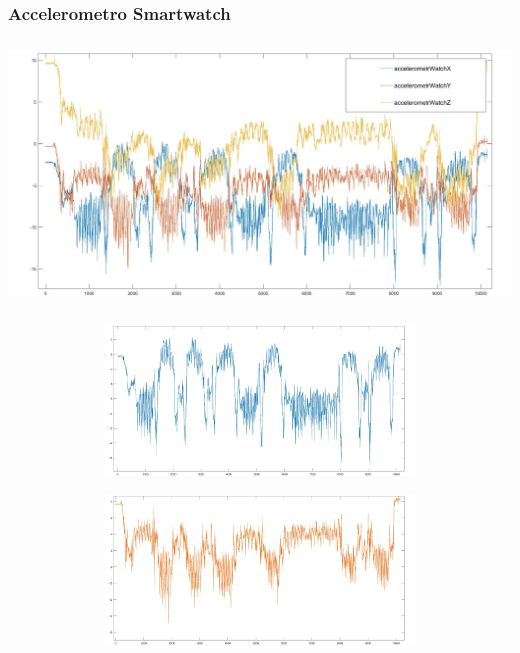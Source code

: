 \documentclass[a4paper]{article}
\begin{document}
\clearpage

\subsubsection{Accelerometro Smartwatch}
\begin{minipage}{\linewidth}
\begin{center}
\includegraphics[width=160mm, height= 70mm]{./images/registrazione_tesi/accelerometrXYZ.jpg} 
\end{center}
\end{minipage}
\makebox[\linewidth]{}
\makebox[\linewidth]{}\makebox[\linewidth]{}\makebox[\linewidth]{}
\makebox[\linewidth]{}\makebox[\linewidth]{}\makebox[\linewidth]{}
\makebox[\linewidth]{}\makebox[\linewidth]{}\makebox[\linewidth]{}

\begin{minipage}{\linewidth}
\begin{center}
\includegraphics[width=154mm, height= 40mm]{./images/registrazione_tesi/accX.jpg} 
\end{center}
\end{minipage}
\makebox[\linewidth]{}

\begin{minipage}{\linewidth}
\begin{center}
\includegraphics[width=154mm, height= 40mm]{./images/registrazione_tesi/accY.jpg} 
\end{center}
\end{minipage}
\makebox[\linewidth]{}
\end{document}
